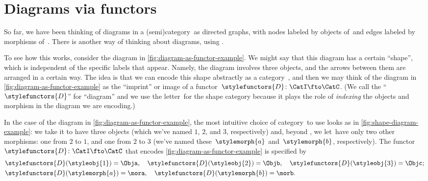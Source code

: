
\section{Diagrams via functors}

So far, we have been thinking of diagrams in a (semi)category~\CatC as directed graphs, with nodes labeled by objects of~\CatC and edges labeled by morphisms of~\CatC.
There is another way of thinking about diagrams, using .

To see how this works, consider the diagram in \cref{fig:diagram-as-functor-example}.
We might say that this diagram has a certain ``shape'', which is independent of the specific labels that appear.
Namely, the diagram involves three objects, and the arrows between them are arranged in a certain way.
The idea is that we can encode this shape abstractly as a category~\CatI, and then we may think of the diagram in \cref{fig:diagram-as-functor-example} as the ``imprint'' or image of a functor~$\stylefunctors{D}\colon \CatI \fto \CatC$.
(We call the  ``$\stylefunctors{D}$'' for ``diagram'' and we use the letter~\CatI for the shape category because it plays the role of \emph{indexing} the objects and morphism in the diagram we are encoding.)

\begin{marginfigure}
    \centering
    \caption{}
    \label{fig:diagram-as-functor-example}
\end{marginfigure}

\begin{marginfigure}
    \centering
    \caption{}
    \label{fig:shape-diagram-example}
\end{marginfigure}

In the case of the diagram in \cref{fig:diagram-as-functor-example}, the most intuitive choice of category~\CatI to use looks as in \cref{fig:shape-diagram-example}: we take it to have three objects (which we've named $1$, $2$, and $3$, respectively) and, beyond , we let~\CatI have only two other morphisms: one from $2$ to $1$, and one from $2$ to $3$ (we've named these~$\stylemorph{a}$ and~$\stylemorph{b}$, respectively).
The functor~$\stylefunctors{D}\colon \CatI \fto \CatC$ that encodes \cref{fig:diagram-as-functor-example} is specified by
\begin{align}
     & \stylefunctors{D}(\styleobj{1}) = \Obja, \quad \stylefunctors{D}(\styleobj{2}) = \Objb, \quad  \stylefunctors{D}(\styleobj{3}) = \Objc; \\
     & \stylefunctors{D}(\stylemorph{a}) = \mora, \quad \stylefunctors{D}(\stylemorph{b}) = \morb.
\end{align}

